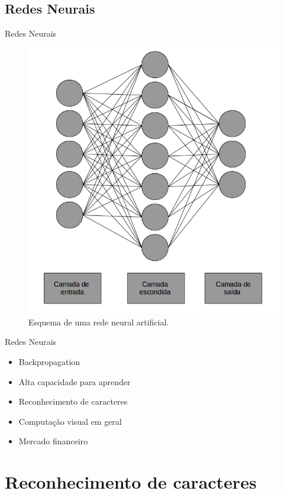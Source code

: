 \documentclass{beamer}
\begin{document}
    \subsection{Redes Neurais}
        \begin{frame}{Redes Neurais}
            \begin{figure}[ht]
            \centering           
            \includegraphics[width=.7\textwidth,height=.7\textheight]{redeneural.png}
            \caption{Esquema de uma rede neural artificial.}
            \label{fig:ann}
            \end{figure}        
        \end{frame}
    
        \begin{frame}{Redes Neurais}
            \begin{itemize}
                \item Backpropagation
                \item Alta capacidade para aprender
                \item Reconhecimento de caracteres
                \item Computação visual em geral
                \item Mercado financeiro
            \end{itemize}
        \end{frame}
\section{Reconhecimento de caracteres}
\end{document}

